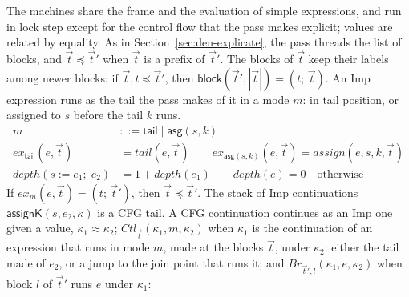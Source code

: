 \documentclass[10pt]{article}
\theoremstyle{acmplain}
\newcommand{\key}[1]{\mathsf{#1}}
\newcommand{\pass}[1]{\mathit{#1}}
\newcommand{\Kf}[2]{\key{#1}(#2)}
\newcommand{\assign}[3]{#1 \mathrel{:=} #2;\; #3}
\begin{document}
The machines share the frame and the evaluation of simple expressions,
and run in lock step except for the control flow that the pass makes
explicit; values are related by equality. As in
Section~\ref{sec:den-explicate}, the pass threads the list of blocks,
and $\vec{t} \preceq \vec{t}'$ when $\vec{t}$ is a prefix of $\vec{t}'$.
The blocks of $\vec{t}$ keep their labels among newer blocks: if
$\vec{t}, t \preceq \vec{t}'$, then
$\key{block}(\vec{t}', |\vec{t}|) = (t;\, \vec{t})$. An Imp expression
runs as the tail the pass makes of it in a mode $m$: in tail position,
or assigned to $s$ before the tail $k$ runs.
\begin{align*}
  m &::= \key{tail} \mid \key{asg}(s, k) \\
  \pass{ex}_{\key{tail}}(e, \vec{t}) &= \pass{tail}(e, \vec{t}) \qquad
  \pass{ex}_{\key{asg}(s, k)}(e, \vec{t}) = \pass{assign}(e, s, k, \vec{t}) \\[1ex]
  \mathit{depth}(\assign{s}{e_1}{e_2}) &= 1 + \mathit{depth}(e_1) \qquad
  \mathit{depth}(e) = 0 \quad \text{otherwise}
\end{align*}
If $\pass{ex}_m(e, \vec{t}) = (t;\, \vec{t}')$, then $\vec{t} \preceq \vec{t}'$.
The stack of Imp continuations $\Kf{assignK}{s, e_2, \kappa}$ is a CFG
tail. A CFG continuation continues as an Imp one given a value,
$\kappa_1 \approx \kappa_2$; $\mathit{Ctl}_{\vec{t}}(\kappa_1, m, \kappa_2)$
when $\kappa_1$ is the continuation of an expression that runs in mode
$m$, made at the blocks $\vec{t}$, under $\kappa_2$: either the tail
made of $e_2$, or a jump to the join point that runs it; and
$\mathit{Br}_{\vec{t}', l}(\kappa_1, e, \kappa_2)$ when block $l$ of
$\vec{t}'$ runs $e$ under $\kappa_1$:
\end{document}
